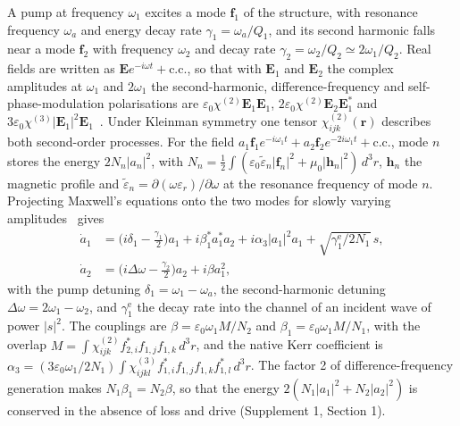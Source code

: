 \documentclass{optica-article}
\newcommand{\chitwo}{\chi^{(2)}}
\newcommand{\chithree}{\chi^{(3)}}
\newcommand{\Dom}{\Delta\omega}
\newcommand{\f}{\mathbf f}
\begin{document}
A pump at frequency $\omega_1$ excites a mode $\f_1$ of the structure, with
resonance frequency $\omega_a$ and energy decay rate
$\gamma_1=\omega_a/Q_1$, and its second harmonic falls near a mode $\f_2$
with frequency $\omega_2$ and decay rate
$\gamma_2=\omega_2/Q_2\simeq2\omega_1/Q_2$.  Real fields are written as
$\mathbf E e^{-i\omega t}+\mathrm{c.c.}$, so that with $\mathbf E_1$ and
$\mathbf E_2$ the complex amplitudes at $\omega_1$ and $2\omega_1$ the
second-harmonic, difference-frequency and self-phase-modulation
polarisations are
$\varepsilon_0\chitwo\mathbf E_1\mathbf E_1$,
$2\varepsilon_0\chitwo\mathbf E_2\mathbf E_1^*$ and
$3\varepsilon_0\chithree|\mathbf E_1|^2\mathbf E_1$~\cite{boyd2020}.
Under Kleinman symmetry one tensor $\chitwo_{ijk}(\mathbf r)$ describes both
second-order processes.  For the field
$a_1\f_1e^{-i\omega_1t}+a_2\f_2e^{-2i\omega_1t}+\mathrm{c.c.}$, mode $n$
stores the energy $2N_n|a_n|^2$, with
$N_n=\tfrac12\int(\varepsilon_0\tilde\varepsilon_n|\f_n|^2+\mu_0|\mathbf h_n|^2)\,d^3r$,
$\mathbf h_n$ the magnetic profile and
$\tilde\varepsilon_n=\partial(\omega\varepsilon_r)/\partial\omega$ at the
resonance frequency of mode $n$.  Projecting Maxwell's equations onto the two modes for slowly
varying amplitudes~\cite{johnson2002,rodriguez2007} gives
\begin{align}
  \dot a_1&=\bigl(i\delta_1-\tfrac{\gamma_1}{2}\bigr)a_1
    +i\beta_1^*a_1^*a_2+i\alpha_3|a_1|^2a_1+\sqrt{\gamma_1^{\mathrm e}/2N_1}\,s,\label{eq:cmt1}\\
  \dot a_2&=\bigl(i\Dom-\tfrac{\gamma_2}{2}\bigr)a_2+i\beta a_1^2,\label{eq:cmt2}
\end{align}
with the pump detuning $\delta_1=\omega_1-\omega_a$, the second-harmonic
detuning $\Dom=2\omega_1-\omega_2$, and $\gamma_1^{\mathrm e}$ the decay
rate into the channel of an incident wave of power $|s|^2$.  The couplings are
$\beta=\varepsilon_0\omega_1M/N_2$ and $\beta_1=\varepsilon_0\omega_1M/N_1$,
with the overlap $M=\int\chitwo_{ijk}f^*_{2,i}f_{1,j}f_{1,k}\,d^3r$, and
the native Kerr coefficient is
$\alpha_3=(3\varepsilon_0\omega_1/2N_1)\int\chithree_{ijkl}f^*_{1,i}f_{1,j}f_{1,k}f^*_{1,l}\,d^3r$.
The factor 2 of difference-frequency generation makes
$N_1\beta_1=N_2\beta$, so that the energy
$2(N_1|a_1|^2+N_2|a_2|^2)$ is conserved in the absence of loss and drive
(Supplement 1, Section 1).
\end{document}
